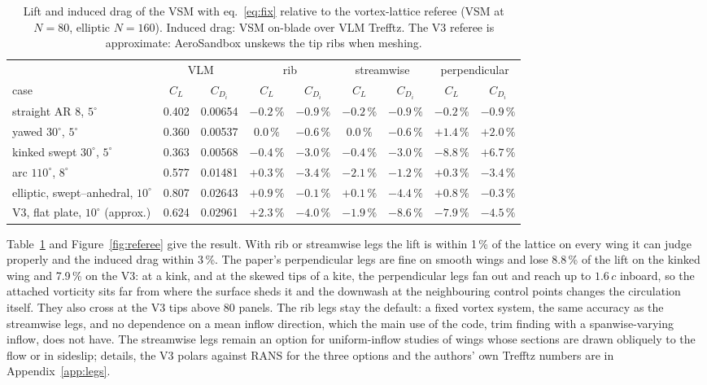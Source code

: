 \documentclass[11pt,a4paper]{article}
\begin{document}
\begin{table}[h]\centering\small
\caption{Lift and induced drag of the VSM with eq.~\eqref{eq:fix} relative to the vortex-lattice referee (VSM at $N=80$, elliptic $N=160$). Induced drag: VSM on-blade over VLM Trefftz. The V3 referee is approximate: AeroSandbox unskews the tip ribs when meshing.}
\label{tab:referee}
\begin{tabular}{lcc|cc|cc|cc}
\toprule
 & \multicolumn{2}{c|}{VLM} & \multicolumn{2}{c|}{rib} & \multicolumn{2}{c|}{streamwise} & \multicolumn{2}{c}{perpendicular}\\
case & $C_L$ & $C_{D_i}$ & $C_L$ & $C_{D_i}$ & $C_L$ & $C_{D_i}$ & $C_L$ & $C_{D_i}$\\
\midrule
straight AR 8, $5^\circ$ & 0.402 & 0.00654 & $-0.2\,\%$ & $-0.9\,\%$ & $-0.2\,\%$ & $-0.9\,\%$ & $-0.2\,\%$ & $-0.9\,\%$\\
yawed $30^\circ$, $5^\circ$ & 0.360 & 0.00537 & $0.0\,\%$ & $-0.6\,\%$ & $0.0\,\%$ & $-0.6\,\%$ & $+1.4\,\%$ & $+2.0\,\%$\\
kinked swept $30^\circ$, $5^\circ$ & 0.363 & 0.00568 & $-0.4\,\%$ & $-3.0\,\%$ & $-0.4\,\%$ & $-3.0\,\%$ & $-8.8\,\%$ & $+6.7\,\%$\\
arc $110^\circ$, $8^\circ$ & 0.577 & 0.01481 & $+0.3\,\%$ & $-3.4\,\%$ & $-2.1\,\%$ & $-1.2\,\%$ & $+0.3\,\%$ & $-3.4\,\%$\\
elliptic, swept--anhedral, $10^\circ$ & 0.807 & 0.02643 & $+0.9\,\%$ & $-0.1\,\%$ & $+0.1\,\%$ & $-4.4\,\%$ & $+0.8\,\%$ & $-0.3\,\%$\\
V3, flat plate, $10^\circ$ (approx.) & 0.624 & 0.02961 & $+2.3\,\%$ & $-4.0\,\%$ & $-1.9\,\%$ & $-8.6\,\%$ & $-7.9\,\%$ & $-4.5\,\%$\\
\bottomrule
\end{tabular}
\end{table}

Table~\ref{tab:referee} and Figure~\ref{fig:referee} give the result. With rib or streamwise legs the lift is within 1\,\% of the lattice on every wing it can judge properly and the induced drag within 3\,\%. The paper's perpendicular legs are fine on smooth wings and lose 8.8\,\% of the lift on the kinked wing and 7.9\,\% on the V3: at a kink, and at the skewed tips of a kite, the perpendicular legs fan out and reach up to $1.6\,c$ inboard, so the attached vorticity sits far from where the surface sheds it and the downwash at the neighbouring control points changes the circulation itself. They also cross at the V3 tips above 80 panels. The rib legs stay the default: a fixed vortex system, the same accuracy as the streamwise legs, and no dependence on a mean inflow direction, which the main use of the code, trim finding with a spanwise-varying inflow, does not have. The streamwise legs remain an option for uniform-inflow studies of wings whose sections are drawn obliquely to the flow or in sideslip; details, the V3 polars against RANS for the three options and the authors' own Trefftz numbers are in Appendix~\ref{app:legs}.
\end{document}
